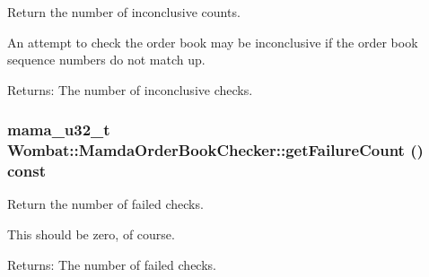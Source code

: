 Return the number of inconclusive counts. 

An attempt to check the order book may be inconclusive if the order book sequence numbers do not match up.

\begin{Desc}
\item[Returns:]The number of inconclusive checks. \end{Desc}
\hypertarget{classWombat_1_1MamdaOrderBookChecker_66714db80a06cc1c1582e4bdfd1279ba}{
\subsubsection[getFailureCount]{\setlength{\rightskip}{0pt plus 5cm}mama\_\-u32\_\-t Wombat::Mamda\-Order\-Book\-Checker::get\-Failure\-Count () const}}
\label{classWombat_1_1MamdaOrderBookChecker_66714db80a06cc1c1582e4bdfd1279ba}


Return the number of failed checks. 

This should be zero, of course.

\begin{Desc}
\item[Returns:]The number of failed checks. \end{Desc}
